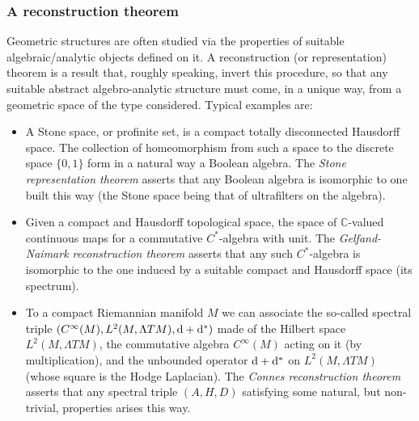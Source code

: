 \documentclass[11pt]{article}
\numberwithin{equation}{section}
\renewcommand{\d}{{\rm d}}
\begin{document}
\subsubsection{A reconstruction theorem}
Geometric structures are often studied via the properties of suitable algebraic/analytic objects defined on it.  A reconstruction (or representation) theorem is a result that, roughly speaking, invert this procedure, so that any suitable abstract algebro-analytic structure must come, in a unique way, from a  geometric space of the type considered. Typical examples are:
\begin{itemize}
\item[i)] A Stone space, or profinite set, is a compact totally disconnected Hausdorff space. The collection of homeomorphism from such a space to the discrete space $\{0,1\}$ form in a natural way a Boolean algebra. The \emph{Stone representation theorem} asserts that any Boolean algebra is isomorphic to one built this way (the Stone space being that of ultrafilters on the algebra).
\item[ii)] Given a compact and Hausdorff topological space, the space of ${\mathbb C}$-valued continuous maps for a commutative $C^*$-algebra with unit. The  \emph{Gelfand-Naimark reconstruction theorem} asserts that any such  $C^*$-algebra is isomorphic to the one induced by a suitable compact and Hausdorff space (its spectrum).
\item[iii)] To a compact Riemannian manifold $M$ we can associate the so-called spectral triple $(C^\infty(M),L^2(M,\Lambda TM),\d+\d^*)$ made of the  Hilbert space $L^2(M,\Lambda TM)$, the commutative algebra $C^\infty(M)$ acting on it (by multiplication),  and the unbounded operator  $\d+\d^*$ on  $L^2(M,\Lambda TM)$ (whose square is the Hodge Laplacian).  The \emph{Connes reconstruction theorem} asserts that any spectral triple $(A,H,D)$ satisfying some natural, but non-trivial, properties arises this way. 
 \end{itemize}
\end{document}
